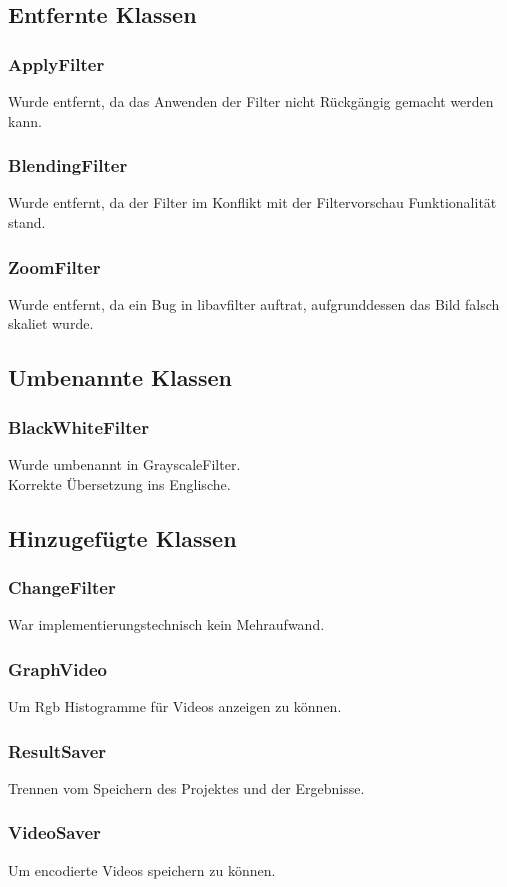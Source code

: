 \documentclass{scrartcl}
\begin{document}
{\subsection{Entfernte Klassen}
\bigskip
\subsubsection{ApplyFilter}
Wurde entfernt, da das Anwenden der Filter nicht Rückgängig gemacht werden kann.
\subsubsection{BlendingFilter}
Wurde entfernt, da der Filter im Konflikt mit der Filtervorschau Funktionalität stand.
\subsubsection{ZoomFilter}
Wurde entfernt, da ein Bug in libavfilter auftrat, aufgrunddessen das Bild falsch skaliet wurde.
\bigskip
\subsection{Umbenannte Klassen}
\bigskip
\subsubsection{BlackWhiteFilter}
Wurde umbenannt in GrayscaleFilter.\\
Korrekte Übersetzung ins Englische.
\newpage
\subsection{Hinzugefügte Klassen}
\bigskip
\subsubsection{ChangeFilter}
War implementierungstechnisch kein Mehraufwand.
\subsubsection{GraphVideo}
Um Rgb Histogramme für Videos anzeigen zu können.
\subsubsection{ResultSaver}
Trennen vom Speichern des Projektes und der Ergebnisse.
\subsubsection{VideoSaver}
Um encodierte Videos speichern zu können.
}
\end{document}
